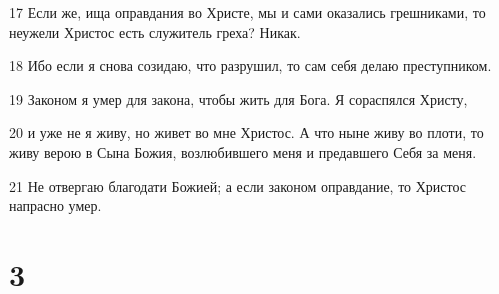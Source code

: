 \par 17 Если же, ища оправдания во Христе, мы и сами оказались грешниками, то неужели Христос есть служитель греха? Никак.
\par 18 Ибо если я снова созидаю, что разрушил, то сам себя делаю преступником.
\par 19 Законом я умер для закона, чтобы жить для Бога. Я сораспялся Христу,
\par 20 и уже не я живу, но живет во мне Христос. А что ныне живу во плоти, то живу верою в Сына Божия, возлюбившего меня и предавшего Себя за меня.
\par 21 Не отвергаю благодати Божией; а если законом оправдание, то Христос напрасно умер.

\chapter{3}

